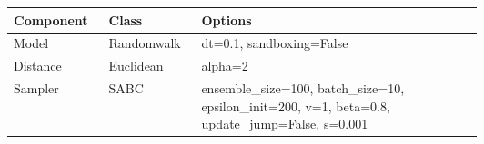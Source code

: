 \begin{tabular}{|l|l|L{0.6\linewidth}|}
\hline
Component & Class & Options\\
\hline
\hline
Model & Randomwalk & dt=0.1, sandboxing=False\\
\hline
Distance & Euclidean & alpha=2\\
\hline
Sampler & SABC & ensemble\_size=100, batch\_size=10, epsilon\_init=200, v=1, beta=0.8, update\_jump=False, s=0.001\\
\hline
\end{tabular}